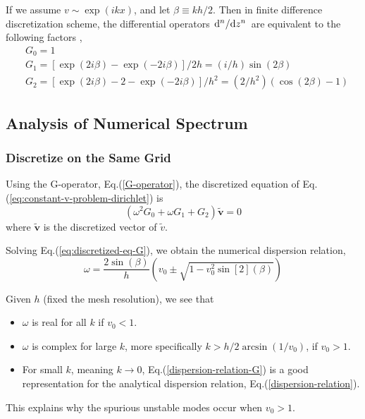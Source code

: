 If we assume $v\sim \exp(ikx)$, and let $\beta\equiv kh/2$. Then in finite difference discretization scheme, the differential operators $\dv*[n]{z}$ are equivalent to the following factors \cite{llobet_spectral_1990},
\begin{align}
	 & G_0 = 1 \nonumber                                                              \\
	 & G_1 = [\exp(2i\beta)-\exp(-2i\beta)]/2h = (i/h)\sin(2\beta)
	\label{G-operator}                                                                \\
	 & G_2 = [\exp(2i\beta)-2-\exp(-2i\beta)]/h^2 = (2/h^2)(\cos(2\beta)-1) \nonumber
\end{align}


\subsection{Analysis of Numerical Spectrum}
\subsubsection{Discretize on the Same Grid}
Using the G-operator, Eq.(\ref{G-operator}), the discretized equation of Eq.(\ref{eq:constant-v-problem-dirichlet}) is
\begin{equation} \label{eq:discretized-eq-G}
	(\omega^2G_0 + \omega G_1 + G_2)\mathbf{\tilde{v}} = 0
\end{equation}
where $\mathbf{\tilde{v}}$ is the discretized vector of $\tilde{v}$.

Solving Eq.(\ref{eq:discretized-eq-G}), we obtain the numerical dispersion relation,
\begin{equation} \label{dispersion-relation-G}
	\omega = \frac{2\sin(\beta)}{h}\left(v_0 \pm \sqrt{1 - v_0^2\sin[2](\beta)}\right)
\end{equation}

Given $h$ (fixed the mesh resolution), we see that
\begin{itemize}
	\item $\omega$ is real for all $k$ if $v_0 < 1$.
	\item $\omega$ is complex for large $k$, more specifically $k>h/2\arcsin(1/v_0)$, if $v_0 > 1$.
	\item For small $k$, meaning $k\to 0$, Eq.(\ref{dispersion-relation-G}) is a good representation for the analytical dispersion relation, Eq.(\ref{dispersion-relation}).
\end{itemize}
This explains why the spurious unstable modes occur when $v_0>1$.

